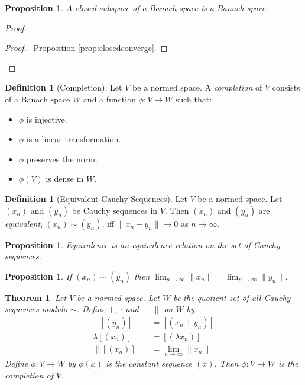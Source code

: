 \documentclass{book}
\let\qed\relax
\newtheorem{prop}[ax]{Proposition}
\newtheorem{thm}[ax]{Theorem}
\theoremstyle{definition}
\newtheorem{df}[ax]{Definition}
\begin{document}
\begin{prop}
A closed subspace of a Banach space is a Banach space.
\end{prop}

\begin{proof}
\pf
{}
\begin{proof}
	\pf\ Proposition \ref{prop:closedconverge}.
\end{proof}
\qed
\end{proof}

\begin{df}[Completion]
Let $V$ be a normed space. A \emph{completion} of $V$ consists of a Banach space $W$ and a function $\phi : V \rightarrow W$ such that:
\begin{itemize}
\item $\phi$ is injective.
\item $\phi$ is a linear transformation.
\item $\phi$ preserves the norm.
\item $\phi(V)$ is dense in $W$.
\end{itemize}
\end{df}

\begin{df}[Equivalent Cauchy Sequences]
Let $V$ be a normed space. Let $(x_n)$ and $(y_n)$ be Cauchy sequences in $V$. Then $(x_n)$ and $(y_n)$ are \emph{equivalent}, $(x_n) \sim (y_n)$, iff $\| x_n - y_n \| \rightarrow 0$ as $n \rightarrow \infty$.
\end{df}

\begin{prop}
Equivalence is an equivalence relation on the set of Cauchy sequences.
\end{prop}

\begin{prop}
If $(x_n) \sim (y_n)$ then $\lim_{n \rightarrow \infty} \| x_n \| = \lim_{n \rightarrow \infty} \| y_n \|$.
\end{prop}

\begin{thm}
Let $V$ be a normed space. Let $W$ be the quotient set of all Cauchy sequences modulo $\sim$. Define $+$, $\cdot$ and $\|\ \|$ on $W$ by
\begin{align*}
[(x_n)] + [(y_n)] & = [(x_n + y_n)] \\
\lambda [(x_n)] & = [(\lambda x_n)] \\
\| [(x_n)] \| & = \lim_{n \rightarrow \infty} \| x_n \|
\end{align*}
Define $\phi : V \rightarrow W$ by $\phi(x)$ is the constant sequence $(x)$. Then $\phi : V \rightarrow W$ is the completion of $V$.
\end{thm}
\end{document}
